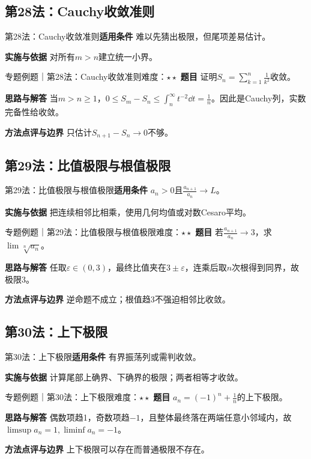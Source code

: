 \subsection{第28法：Cauchy收敛准则}\label{mat:limits_35:k28}
\begin{method}{第28法：Cauchy收敛准则}\textbf{适用条件} 难以先猜出极限，但尾项差易估计。\par\textbf{实施与依据} 对所有$m>n$建立统一小界。\end{method}
\begin{example}{专题例题｜第28法：Cauchy收敛准则}{难度：$\star\star$}
\textbf{题目} 证明$S_n=\sum_{k=1}^n\frac{1}{k^2}$收敛。\par\textbf{思路与解答} 当$m>n\ge1$，$0\le S_m-S_n\le\int_n^\infty t^{-2}\dd t=\frac{1}{n}$。因此是Cauchy列，实数完备性给收敛。\par\textbf{方法点评与边界} 只估计$S_{n+1}-S_n\to0$不够。
\end{example}
\subsection{第29法：比值极限与根值极限}\label{mat:limits_35:k29}
\begin{method}{第29法：比值极限与根值极限}\textbf{适用条件} $a_n>0$且$\frac{a_{n+1}}{a_n}\to L$。\par\textbf{实施与依据} 把连续相邻比相乘，使用几何均值或对数Cesaro平均。\end{method}
\begin{example}{专题例题｜第29法：比值极限与根值极限}{难度：$\star\star$}
\textbf{题目} 若$\frac{a_{n+1}}{a_n}\to3$，求$\lim\sqrt[n]{a_n}$。\par\textbf{思路与解答} 任取$\varepsilon\in(0,3)$，最终比值夹在$3\pm\varepsilon$，连乘后取$n$次根得到同界，故极限3。\par\textbf{方法点评与边界} 逆命题不成立；根值趋3不强迫相邻比收敛。
\end{example}
\subsection{第30法：上下极限}\label{mat:limits_35:k30}
\begin{method}{第30法：上下极限}\textbf{适用条件} 有界振荡列或需判收敛。\par\textbf{实施与依据} 计算尾部上确界、下确界的极限；两者相等才收敛。\end{method}
\begin{example}{专题例题｜第30法：上下极限}{难度：$\star\star$}
\textbf{题目} $a_n=(-1)^n+\frac{1}{n}$的上下极限。\par\textbf{思路与解答} 偶数项趋1，奇数项趋$-1$，且整体最终落在两端任意小邻域内，故$\limsup a_n=1,\liminf a_n=-1$。\par\textbf{方法点评与边界} 上下极限可以存在而普通极限不存在。
\end{example}
